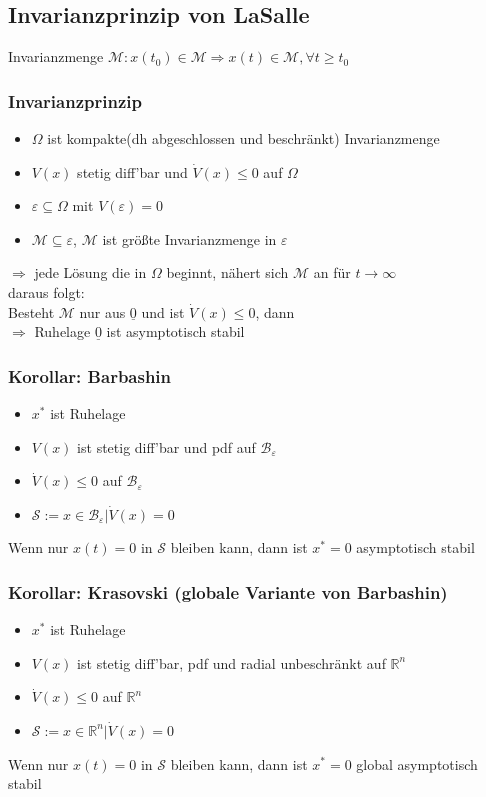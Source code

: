 \documentclass[german]{latex4ei/latex4ei_sheet}
\begin{document}
\begin{sectionbox}
\subsection{Invarianzprinzip von LaSalle}
Invarianzmenge $\mathcal{M}: x(t_0) \in \mathcal{M} \Rightarrow  x(t) \in \mathcal{M}, \forall t \geq t_0$

\subsubsection{Invarianzprinzip}
\begin{itemize}
  \item $\Omega$ ist kompakte(dh abgeschlossen und beschränkt) Invarianzmenge
  \item $V(x)$ stetig diff'bar und $\dot{V}(x) \leq 0$ auf $\Omega$
  \item $\varepsilon \subseteq \Omega$ mit $V(\varepsilon) = 0$
  \item $\mathcal{M} \subseteq \varepsilon$, $\mathcal{M}$ ist größte Invarianzmenge in $\varepsilon$
\end{itemize}
$\Rightarrow$ jede Lösung die in $\Omega$ beginnt, nähert sich $\mathcal{M}$ an für $t \rightarrow \infty$ \\
daraus folgt: \\
Besteht $\mathcal{M}$ nur aus $\underline{0}$ und ist $\dot{V}(x) \leq 0$, dann \\
$\Rightarrow$ Ruhelage $\underline{0}$ ist asymptotisch stabil

\subsubsection{Korollar: Barbashin}
\begin{itemize}
  \item $x^*$ ist Ruhelage
  \item $V(x)$ ist stetig diff'bar und pdf auf $\mathcal{B}_\varepsilon$
  \item $\dot{V}(x) \leq 0$ auf $\mathcal{B}_\varepsilon$
  \item $\mathcal{S} := {x \in \mathcal{B}_\varepsilon | \dot{V}(x) = 0 }$
\end{itemize}
Wenn nur $x(t)=0$ in $\mathcal{S}$ bleiben kann, dann ist $x^* = 0$ asymptotisch stabil

\subsubsection{Korollar: Krasovski (globale Variante von Barbashin)}
\begin{itemize}
  \item $x^*$ ist Ruhelage
  \item $V(x)$ ist stetig diff'bar, pdf und radial unbeschränkt auf $\mathbb{R}^n$
  \item $\dot{V}(x) \leq 0$ auf $\mathbb{R}^n$
  \item $\mathcal{S} := {x \in \mathbb{R}^n | \dot{V}(x) = 0 }$
\end{itemize}
Wenn nur $x(t)=0$ in $\mathcal{S}$ bleiben kann, dann ist $x^* = 0$ global asymptotisch stabil
\end{sectionbox}
\end{document}
